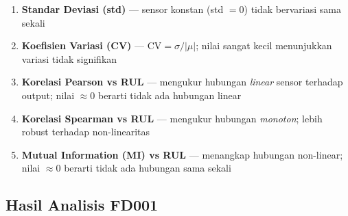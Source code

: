 \documentclass[11pt,a4paper]{article}
\begin{document}
\begin{enumerate}[noitemsep]
  \item \textbf{Standar Deviasi (std)} --- sensor konstan (std $= 0$)
    tidak bervariasi sama sekali
  \item \textbf{Koefisien Variasi (CV)} --- $\text{CV} = \sigma/|\mu|$;
    nilai sangat kecil menunjukkan variasi tidak signifikan
  \item \textbf{Korelasi Pearson vs RUL} --- mengukur hubungan \textit{linear}
    sensor terhadap output; nilai $\approx 0$ berarti tidak ada hubungan linear
  \item \textbf{Korelasi Spearman vs RUL} --- mengukur hubungan
    \textit{monoton}; lebih robust terhadap non-linearitas
  \item \textbf{Mutual Information (MI) vs RUL} --- menangkap hubungan
    non-linear; nilai $\approx 0$ berarti tidak ada hubungan sama sekali
\end{enumerate}

\subsection{Hasil Analisis FD001}
\end{document}
